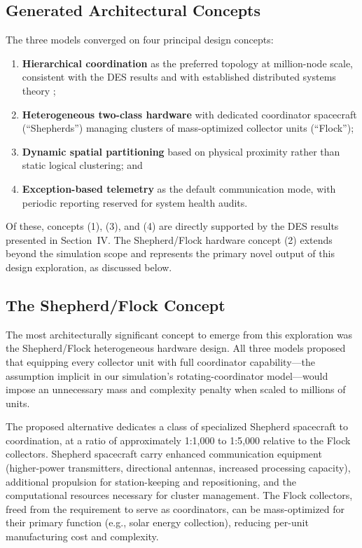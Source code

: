 \documentclass[journal]{IEEEtran}
\begin{document}
\subsection{Generated Architectural Concepts}

The three models converged on four principal design concepts:

\begin{enumerate}
    \item \textbf{Hierarchical coordination} as the preferred topology at million-node scale, consistent with the DES results and with established distributed systems theory \cite{lynch_distributed};
    \item \textbf{Heterogeneous two-class hardware} with dedicated coordinator spacecraft (``Shepherds'') managing clusters of mass-optimized collector units (``Flock'');
    \item \textbf{Dynamic spatial partitioning} based on physical proximity rather than static logical clustering; and
    \item \textbf{Exception-based telemetry} as the default communication mode, with periodic reporting reserved for system health audits.
\end{enumerate}

Of these, concepts (1), (3), and (4) are directly supported by the DES results presented in Section~IV. The Shepherd/Flock hardware concept (2) extends beyond the simulation scope and represents the primary novel output of this design exploration, as discussed below.

\subsection{The Shepherd/Flock Concept}

The most architecturally significant concept to emerge from this exploration was the Shepherd/Flock heterogeneous hardware design. All three models proposed that equipping every collector unit with full coordinator capability---the assumption implicit in our simulation's rotating-coordinator model---would impose an unnecessary mass and complexity penalty when scaled to millions of units.

The proposed alternative dedicates a class of specialized Shepherd spacecraft to coordination, at a ratio of approximately 1:1{,}000 to 1:5{,}000 relative to the Flock collectors. Shepherd spacecraft carry enhanced communication equipment (higher-power transmitters, directional antennas, increased processing capacity), additional propulsion for station-keeping and repositioning, and the computational resources necessary for cluster management. The Flock collectors, freed from the requirement to serve as coordinators, can be mass-optimized for their primary function (e.g., solar energy collection), reducing per-unit manufacturing cost and complexity.
\end{document}
